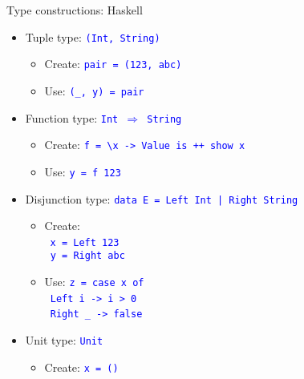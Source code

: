 \documentclass[english]{beamer}
\begin{document}
\begin{frame}{Type constructions: Haskell}

\begin{itemize}
\item Tuple type: \texttt{\textcolor{blue}{\footnotesize{}(Int, String)}}{\footnotesize \par}
\begin{itemize}
\item Create: \texttt{\textcolor{blue}{\footnotesize{}pair = (123, \textquotedbl{}abc\textquotedbl{})}} 
\item Use: \texttt{\textcolor{blue}{\footnotesize{}(\_, y) = pair}}{\footnotesize \par}
\end{itemize}
\item Function type: \texttt{\textcolor{blue}{\footnotesize{}Int $\Rightarrow$
String}}{\footnotesize \par}
\begin{itemize}
\item Create: \texttt{\textcolor{blue}{\footnotesize{}f = \textbackslash{}x
-> \textquotedbl{}Value is \textquotedbl{} ++ show x}} 
\item Use: \texttt{\textcolor{blue}{\footnotesize{}y = f 123}}{\footnotesize \par}
\end{itemize}
\item Disjunction type: \texttt{\textcolor{blue}{\footnotesize{}data E =
Left Int | Right String}}{\footnotesize \par}
\begin{itemize}
\item Create:\\
\  \texttt{\textcolor{blue}{\footnotesize{}x = Left 123}}~\\
\texttt{\textcolor{blue}{\footnotesize{} y = Right \textquotedbl{}abc\textquotedbl{}}}{\footnotesize \par}
\item Use: \texttt{\textcolor{blue}{\footnotesize{}z = case x of}}~\\
\texttt{\textcolor{blue}{\footnotesize{} Left i -> i > 0}}~\\
\texttt{\textcolor{blue}{\footnotesize{} Right \_ -> false}}~\\
{\footnotesize \par}
\end{itemize}
\item Unit type: \texttt{\textcolor{blue}{\footnotesize{}Unit}}{\footnotesize \par}
\begin{itemize}
\item Create: \texttt{\textcolor{blue}{\footnotesize{}x = ()}}{\footnotesize \par}
\end{itemize}
\end{itemize}
\end{frame}
\end{document}

